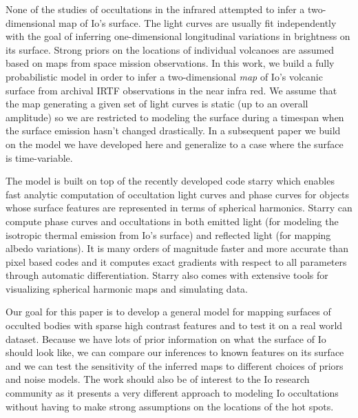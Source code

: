 \documentclass[modern]{aastex62}
\begin{document}
None of the studies of occultations in the infrared attempted to infer a two-dimensional map of Io's surface.
The light curves are usually fit independently with the goal of inferring one-dimensional longitudinal variations in brightness on its surface.
Strong priors on the locations of individual volcanoes are assumed based on maps from space mission observations.
In this work, we build a fully probabilistic model in order to infer a two-dimensional \emph{map} of Io's volcanic surface from archival IRTF observations in the near infra red.
We assume that the map generating a given set of light curves is static (up to an overall amplitude) so we are restricted to modeling the surface during a timespan when the surface emission hasn't changed drastically.
In a subsequent paper we build on the model we have developed here and generalize to a case where the surface is time-variable.

The model is built on top of the recently developed code starry \citep[][Luger et al. 2020 in prep]{luger2019a} which enables fast analytic computation of occultation light curves and phase curves for objects whose surface features are represented in terms of spherical harmonics.
Starry can compute phase curves and occultations in both emitted light (for modeling the isotropic thermal emission from Io's surface) and reflected light (for mapping albedo variations).
It is many orders of magnitude faster and more accurate than pixel based codes and it computes exact gradients with respect to all parameters through automatic differentiation.
Starry also comes with extensive tools for visualizing spherical harmonic maps and simulating data.

Our goal for this paper is to develop a general model for mapping surfaces of occulted bodies with sparse high contrast features and to test it on a real world dataset. 
Because we have lots of prior information on what the surface of Io should look like, we can compare our inferences to known features on its surface and we can test the sensitivity of the inferred maps to different choices of priors and noise models.
The work should also be of interest to the Io research community as it presents a very different approach to modeling Io occultations without having to make strong assumptions on the locations of the hot spots. 
\end{document}
